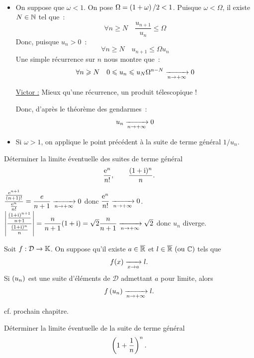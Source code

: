 \documentclass{magnolia}
\begin{document}
\begin{preuve}
$\quad$
\begin{itemize}
\item On suppose que $\omega<1$. On pose $\Omega=\left(1+\omega\right)/2 <1$. Puisque
  $\omega < \Omega$, il existe $N\in\mathbb{N}$ tel que~:
  \[\forall n\geq N \quad \frac{u_{n+1}}{u_n}\leq \Omega\]
  Donc, puisque $u_n>0$~:
  \[\forall n\geq N \quad u_{n+1} \leq \Omega u_n\]
  Une simple récurrence sur $n$ nous montre que~:
  \[\forall n\geqslant N\quad 0\leqslant u_n \leqslant u_N \Omega^{n-N} 
    \xrightarrow[n\rightarrow +\infty]{} 0\]
    
    \underline{Victor :} Mieux qu'une récurrence, un produit télescopique !
    
    
  Donc, d'après le théorème des gendarmes~:
 \[u_n \xrightarrow[n\rightarrow +\infty]{} 0\]
\item Si $\omega>1$, on applique le point précédent à la suite de terme général
  $1/u_n$.
\end{itemize}
\end{preuve}

\begin{exoUnique}
\exo Déterminer la limite éventuelle des suites de terme général
  \[\frac{{\rm e}^n}{n!}, \qquad \frac{(1+{\rm i})^n}{n}.\]
\end{exoUnique}

\begin{sol}
$\dfrac{\frac{{\rm e}^{n+1}}{(n+1)!}}{\frac{{\rm e}^n}{n!}}=\dfrac{e}{n+1}\xrightarrow[n\rightarrow +\infty]{}0$ donc $\dfrac{{\rm e}^n}{n!}\xrightarrow[n\rightarrow +\infty]{}0$.
\\
$\left|\dfrac{\frac{(1+{\rm i})^{n+1}}{n+1}}{\frac{(1+{\rm i})^n}{n}}\right|={\dfrac{n}{n+1}(1+{\rm i})}=\sqrt{2}\dfrac{n}{n+1}\xrightarrow[n\rightarrow +\infty]{}\sqrt{2}$ donc $u_n$ diverge.
\end{sol}




\begin{proposition}[utile=-3]
Soit $f:\mathcal{D}\to\mathbb{K}$. On suppose qu'il existe $a\in\overline{\mathbb{R}}$ et $l\in\text{$\overline{\mathbb{R}}$ (ou $\mathbb{C}$)}$ tels que
\[f(x)\xrightarrow[x\rightarrow a]{}l.\]
Si $\left(u_n\right)$ est une suite d'éléments de $\mathcal{D}$ admettant $a$ pour limite, alors
\[f\left(u_n\right)\xrightarrow[n\rightarrow +\infty]{} l.\]
\end{proposition}

\begin{preuve}
cf. prochain chapitre.
\end{preuve}

\begin{exoUnique}
\exo Déterminer la limite éventuelle de la suite de terme général
  \[\left(1+\frac{1}{n}\right)^n.\]
\end{exoUnique}
\end{document}

